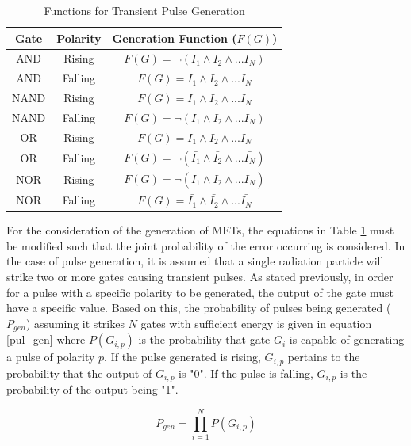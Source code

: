 \begin{table}[ht]
	\begin{center}
		\caption{Functions for Transient Pulse Generation}
		\label{table:gentable}
		\begin{tabular}{|c|c|c|}
			\hline
			Gate & Polarity & Generation Function ($F(G)$) \\ 
			\hline
			AND & Rising & $F(G) =  \lnot (I_1 \land I_2 \land ... I_N)$ \\
			\hline
			AND & Falling & $F(G) = I_1 \land I_2 \land ... I_N$ \\
			\hline
			NAND & Rising & $F(G) = I_1 \land I_2 \land ... I_N$ \\
			\hline
			NAND & Falling & $F(G) = \lnot (I_1 \land I_2 \land ... I_N)$ \\
			\hline
			OR & Rising & $F(G) = \bar{I_1} \land \bar{I_2} \land ... \bar{I_N}$ \\
			\hline
			OR & Falling & $F(G) = \lnot ( \bar{I_1} \land \bar{I_2} \land ... \bar{I_N})$ \\
			\hline
			NOR & Rising & $F(G) = \lnot ( \bar{I_1} \land \bar{I_2} \land ... \bar{I_N})$ \\
			\hline
			NOR & Falling & $F(G) = \bar{I_1} \land \bar{I_2} \land ... \bar{I_N}$ \\
			\hline
		\end{tabular}
	\end{center}
\end{table}

For the consideration of the generation of METs, the equations in Table \ref{table:gentable} must be modified such that the joint probability of the error occurring is considered. In the case of pulse generation, it is assumed that a single radiation particle will strike two or more gates causing transient pulses. As stated previously, in order for a pulse with a specific polarity to be generated, the output of the gate must have a specific value. Based on this, the probability of pulses being generated ($P_{gen}$) assuming it strikes $N$ gates with sufficient energy is given in equation \ref{pul_gen} where $P(G_{i,p})$ is the probability that gate $G_i$ is capable of generating a pulse of polarity $p$. If the pulse generated is rising, $G_{i,p}$ pertains to the probability that the output of $G_{i,p}$ is "0". If the pulse is falling, $G_{i,p}$ is the probability of the output being "1".

\begin{equation} \label{pul_gen}
P_{gen} = \prod_{i=1}^{N} P(G_{i, p})
\end{equation}

